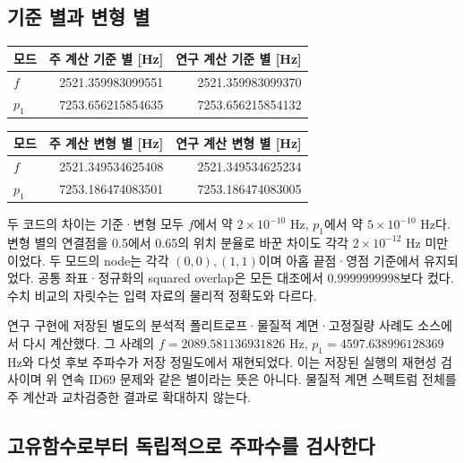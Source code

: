 \documentclass[
  10pt,
  a4paper,
]{article}
\begin{document}
\subsection{기준 별과 변형
별}\label{uxae30uxc900-uxbcc4uxacfc-uxbcc0uxd615-uxbcc4}

\begin{longtable}[]{@{}lrr@{}}
\toprule\noalign{}
모드 & 주 계산 기준 별 {[}Hz{]} & 연구 계산 기준 별 {[}Hz{]} \\
\midrule\noalign{}
\endhead
\bottomrule\noalign{}
\endlastfoot
\(f\) & 2521.359983099551 & 2521.359983099370 \\
\(p_1\) & 7253.656215854635 & 7253.656215854132 \\
\end{longtable}

\begin{longtable}[]{@{}lrr@{}}
\toprule\noalign{}
모드 & 주 계산 변형 별 {[}Hz{]} & 연구 계산 변형 별 {[}Hz{]} \\
\midrule\noalign{}
\endhead
\bottomrule\noalign{}
\endlastfoot
\(f\) & 2521.349534625408 & 2521.349534625234 \\
\(p_1\) & 7253.186474083501 & 7253.186474083005 \\
\end{longtable}

두 코드의 차이는 기준·변형 모두 \(f\)에서 약 \(2\times10^{-10}\) Hz,
\(p_1\)에서 약 \(5\times10^{-10}\) Hz다. 변형 별의 연결점을 0.5에서
0.65의 위치 분율로 바꾼 차이도 각각 \(2\times10^{-12}\) Hz 미만이었다.
두 모드의 node는 각각 \((0,0),(1,1)\)이며 아홉 끝점·영점 기준에서
유지되었다. 공통 좌표·정규화의 squared overlap은 모든 대조에서
\(0.9999999998\)보다 컸다. 수치 비교의 자릿수는 입력 자료의 물리적
정확도와 다르다.

연구 구현에 저장된 별도의 분석적 폴리트로프·물질적 계면·고정질량 사례도
소스에서 다시 계산했다. 그 사례의 \(f=2089.581136931826\) Hz,
\(p_1=4597.638996128369\) Hz와 다섯 후보 주파수가 저장 정밀도에서
재현되었다. 이는 저장된 실행의 재현성 검사이며 위 연속 ID69 문제와 같은
별이라는 뜻은 아니다. 물질적 계면 스펙트럼 전체를 주 계산과 교차검증한
결과로 확대하지 않는다.

\subsection{고유함수로부터 독립적으로 주파수를
검사한다}\label{uxace0uxc720uxd568uxc218uxb85cuxbd80uxd130-uxb3c5uxb9bduxc801uxc73cuxb85c-uxc8fcuxd30cuxc218uxb97c-uxac80uxc0acuxd55cuxb2e4}
\end{document}
